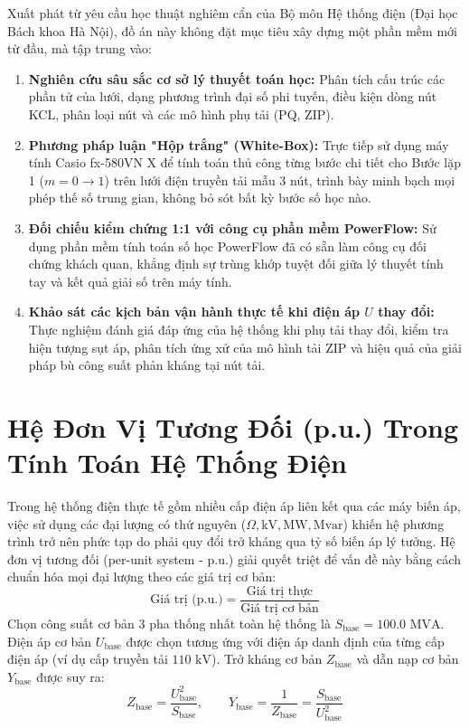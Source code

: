 \documentclass[12pt,a4paper,oneside]{report}
\begin{document}
Xuất phát từ yêu cầu học thuật nghiêm cẩn của Bộ môn Hệ thống điện (Đại học Bách khoa Hà Nội), đồ án này không đặt mục tiêu xây dựng một phần mềm mới từ đầu, mà tập trung vào:
\begin{enumerate}
    \item \textbf{Nghiên cứu sâu sắc cơ sở lý thuyết toán học:} Phân tích cấu trúc các phần tử của lưới, dạng phương trình đại số phi tuyến, điều kiện dòng nút KCL, phân loại nút và các mô hình phụ tải (PQ, ZIP).
    \item \textbf{Phương pháp luận "Hộp trắng" (White-Box):} Trực tiếp sử dụng máy tính Casio fx-580VN X để tính toán thủ công từng bước chi tiết cho Bước lặp 1 ($m = 0 \to 1$) trên lưới điện truyền tải mẫu 3 nút, trình bày minh bạch mọi phép thế số trung gian, không bỏ sót bất kỳ bước số học nào.
    \item \textbf{Đối chiếu kiểm chứng 1:1 với công cụ phần mềm PowerFlow:} Sử dụng phần mềm tính toán số học PowerFlow đã có sẵn làm công cụ đối chứng khách quan, khẳng định sự trùng khớp tuyệt đối giữa lý thuyết tính tay và kết quả giải số trên máy tính.
    \item \textbf{Khảo sát các kịch bản vận hành thực tế khi điện áp $U$ thay đổi:} Thực nghiệm đánh giá đáp ứng của hệ thống khi phụ tải thay đổi, kiểm tra hiện tượng sụt áp, phân tích ứng xử của mô hình tải ZIP và hiệu quả của giải pháp bù công suất phản kháng tại nút tải.
\end{enumerate}

\section{Hệ Đơn Vị Tương Đối (p.u.) Trong Tính Toán Hệ Thống Điện}
Trong hệ thống điện thực tế gồm nhiều cấp điện áp liên kết qua các máy biến áp, việc sử dụng các đại lượng có thứ nguyên ($\Omega, \text{kV}, \text{MW}, \text{Mvar}$) khiến hệ phương trình trở nên phức tạp do phải quy đổi trở kháng qua tỷ số biến áp lý tưởng. Hệ đơn vị tương đối (per-unit system - p.u.) giải quyết triệt để vấn đề này bằng cách chuẩn hóa mọi đại lượng theo các giá trị cơ bản:
\begin{equation}
\text{Giá trị (p.u.)} = \frac{\text{Giá trị thực}}{\text{Giá trị cơ bản}}
\end{equation}
Chọn công suất cơ bản 3 pha thống nhất toàn hệ thống là $S_{\text{base}} = 100.0\text{ MVA}$. Điện áp cơ bản $U_{\text{base}}$ được chọn tương ứng với điện áp danh định của từng cấp điện áp (ví dụ cấp truyền tải $110\text{ kV}$). Trở kháng cơ bản $Z_{\text{base}}$ và dẫn nạp cơ bản $Y_{\text{base}}$ được suy ra:
\begin{equation}
Z_{\text{base}} = \frac{U_{\text{base}}^2}{S_{\text{base}}}, \qquad Y_{\text{base}} = \frac{1}{Z_{\text{base}}} = \frac{S_{\text{base}}}{U_{\text{base}}^2}
\end{equation}
\end{document}
